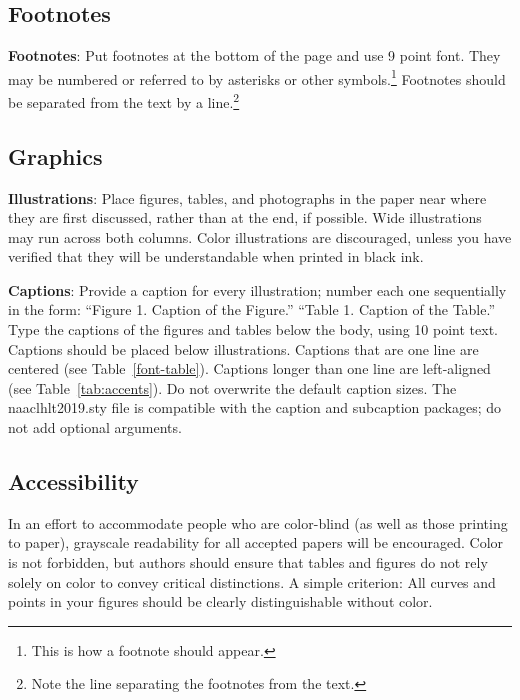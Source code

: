 \documentclass{article}
\begin{document}
\subsection{Footnotes}

{\bf Footnotes}: Put footnotes at the bottom of the page and use 9
point font. They may be numbered or referred to by asterisks or other
symbols.\footnote{This is how a footnote should appear.} Footnotes
should be separated from the text by a line.\footnote{Note the line
separating the footnotes from the text.}

\subsection{Graphics}

{\bf Illustrations}: Place figures, tables, and photographs in the
paper near where they are first discussed, rather than at the end, if
possible.  Wide illustrations may run across both columns.  Color
illustrations are discouraged, unless you have verified that  
they will be understandable when printed in black ink.

{\bf Captions}: Provide a caption for every illustration; number each one
sequentially in the form:  ``Figure 1. Caption of the Figure.'' ``Table 1.
Caption of the Table.''  Type the captions of the figures and 
tables below the body, using 10 point text. Captions should be placed below illustrations. Captions that are one line are centered (see Table~\ref{font-table}). Captions longer than one line are left-aligned (see Table~\ref{tab:accents}). Do not overwrite the default caption sizes. The naaclhlt2019.sty file is compatible with the caption and subcaption packages; do not add optional arguments.


\subsection{Accessibility}
\label{ssec:accessibility}

In an effort to accommodate people who are color-blind (as well as those printing
to paper), grayscale readability for all accepted papers will be
encouraged.  Color is not forbidden, but authors should ensure that
tables and figures do not rely solely on color to convey critical
distinctions. A simple criterion: All curves and points in your figures should be clearly distinguishable without color.

\end{document}
